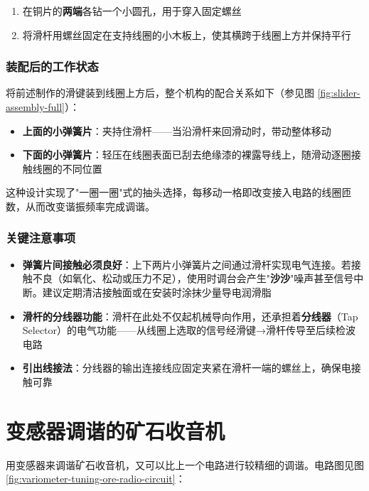 \documentclass[12pt,UTF8]{ctexbook}
\begin{document}
\begin{enumerate}
	\item 在铜片的\textbf{两端}各钻一个小圆孔，用于穿入固定螺丝
	\item 将滑杆用螺丝固定在支持线圈的小木板上，使其横跨于线圈上方并保持平行
\end{enumerate}

\subsubsection{装配后的工作状态}

将前述制作的滑键装到线圈上方后，整个机构的配合关系如下（参见图 \ref{fig:slider-assembly-full}）：

\begin{itemize}
	\item \textbf{上面的小弹簧片}：夹持住滑杆——当沿滑杆来回滑动时，带动整体移动
	\item \textbf{下面的小弹簧片}：轻压在线圈表面已刮去绝缘漆的裸露导线上，随滑动逐圈接触线圈的不同位置
\end{itemize}

这种设计实现了"一圈一圈"式的抽头选择，每移动一格即改变接入电路的线圈匝数，从而改变谐振频率完成调谐。

\subsubsection{关键注意事项}

\begin{itemize}
	\item \textbf{弹簧片间接触必须良好}：上下两片小弹簧片之间通过滑杆实现电气连接。若接触不良（如氧化、松动或压力不足），使用时调台会产生"\textbf{沙沙}"噪声甚至信号中断。建议定期清洁接触面或在安装时涂抹少量导电润滑脂
	\item \textbf{滑杆的分线器功能}：滑杆在此处不仅起机械导向作用，还承担着\textbf{分线器}（Tap Selector）的电气功能——从线圈上选取的信号经滑键→滑杆传导至后续检波电路
	\item \textbf{引出线接法}：分线器的输出连接线应固定夹紧在滑杆一端的螺丝上，确保电接触可靠
\end{itemize}

\section{变感器调谐的矿石收音机}

用变感器来调谐矿石收音机，又可以比上一个电路进行较精细的调谐。电路图见图 \ref{fig:variometer-tuning-ore-radio-circuit}：
\end{document}

